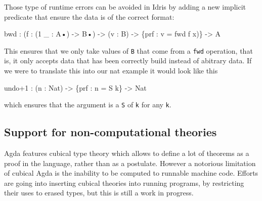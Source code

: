\documentclass[
]{article}
\newenvironment{Shaded}{}{}
\newcommand{\DataTypeTok}[1]{\textcolor[rgb]{0.56,0.13,0.00}{#1}}
\newcommand{\DecValTok}[1]{\textcolor[rgb]{0.25,0.63,0.44}{#1}}
\newcommand{\NormalTok}[1]{#1}
\newcommand{\OperatorTok}[1]{\textcolor[rgb]{0.40,0.40,0.40}{#1}}
\newcommand{\OtherTok}[1]{\textcolor[rgb]{0.00,0.44,0.13}{#1}}
\begin{document}
Those type of runtime errors can be avoided in Idris by adding a new
implicit predicate that ensure the data is of the correct format:

\begin{Shaded}
\begin{Highlighting}[]
\NormalTok{bwd }\OperatorTok{:}\NormalTok{ (f }\OperatorTok{:}\NormalTok{ (}\DecValTok{1}\NormalTok{ \_ }\OperatorTok{:} \DataTypeTok{A}\NormalTok{•) }\OtherTok{{-}\textgreater{}} \DataTypeTok{B}\NormalTok{•) }\OtherTok{{-}\textgreater{}}\NormalTok{ (v }\OperatorTok{:} \DataTypeTok{B}\NormalTok{) }\OtherTok{{-}\textgreater{}}\NormalTok{ \{prf }\OperatorTok{:}\NormalTok{ v }\OtherTok{=}\NormalTok{ fwd f x)\} }\OtherTok{{-}\textgreater{}} \DataTypeTok{A}
\end{Highlighting}
\end{Shaded}

This ensures that we only take values of \texttt{B} that come from a
\texttt{fwd} operation, that is, it only accepts data that has been
correctly build instead of abitrary data. If we were to translate this
into our nat example it would look like this

\begin{Shaded}
\begin{Highlighting}[]
\NormalTok{undo}\OperatorTok{+}\DecValTok{1} \OperatorTok{:}\NormalTok{ (n }\OperatorTok{:} \DataTypeTok{Nat}\NormalTok{) }\OtherTok{{-}\textgreater{}}\NormalTok{ \{prf }\OperatorTok{:}\NormalTok{ n }\OtherTok{=} \DataTypeTok{S}\NormalTok{ k\} }\OtherTok{{-}\textgreater{}} \DataTypeTok{Nat}
\end{Highlighting}
\end{Shaded}

which ensures that the argument is a \texttt{S} of \texttt{k} for any
\texttt{k}.

\hypertarget{support-for-non-computational-theories}{%
\subsection{Support for non-computational
theories}\label{support-for-non-computational-theories}}

Agda features cubical type theory which allows to define a lot of
theorems as a proof in the language, rather than as a postulate. However
a notorious limitation of cubical Agda is the inability to be computed
to runnable machine code. Efforts are going into inserting cubical
theories into running programs, by restricting their uses to erased
types, but this is still a work in progress.
\end{document}
